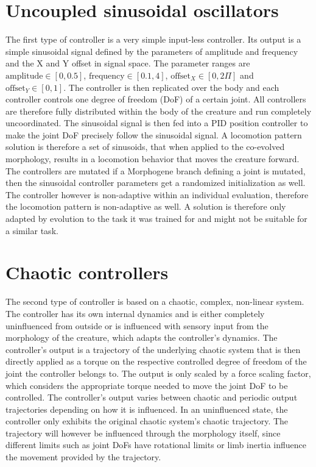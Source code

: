 \documentclass[main]{subfiles}
\begin{document}
\section{Uncoupled sinusoidal oscillators}
\label{sec:sinusoidal-oscillators}

The first type of controller is a very simple input-less controller. Its output is a simple sinusoidal signal defined by the parameters of amplitude and frequency and the X and Y offset in signal space. The parameter ranges are $\text{amplitude} \in [0,0.5]$, $\text{frequency} \in [0.1,4]$, $\text{offset}_X \in [0,2\Pi]$ and $\text{offset}_Y \in [0,1]$. The controller is then replicated over the body and each controller controls one degree of freedom (DoF) of a certain joint. All controllers are therefore fully distributed within the body of the creature and run completely uncoordinated. The sinusoidal signal is then fed into a PID position controller to make the joint DoF precisely follow the sinusoidal signal. A locomotion pattern solution is therefore a set of sinusoids, that when applied to the co-evolved morphology, results in a locomotion behavior that moves the creature forward. The controllers are mutated if a Morphogene branch defining a joint is mutated, then the sinusoidal controller parameters get a randomized initialization as well. The controller however is non-adaptive within an individual evaluation, therefore the locomotion pattern is non-adaptive as well. A solution is therefore only adapted by evolution to the task it was trained for and might not be suitable for a similar task.

\section{Chaotic controllers}
\label{sec:chaotic-controllers}

The second type of controller is based on a chaotic, complex, non-linear system. The controller has its own internal dynamics and is either completely uninfluenced from outside or is influenced with sensory input from the morphology of the creature, which adapts the controller's dynamics. The controller's output is a trajectory of the underlying chaotic system that is then directly applied as a torque on the respective controlled degree of freedom of the joint the controller belongs to. The output is only scaled by a force scaling factor, which considers the appropriate torque needed to move the joint DoF to be controlled. The controller's output varies between chaotic and periodic output trajectories depending on how it is influenced. In an uninfluenced state, the controller only exhibits the original chaotic system's chaotic trajectory. The trajectory will however be influenced through the morphology itself, since different limits such as joint DoFs have rotational limits or limb inertia influence the movement provided by the trajectory.
\end{document}
